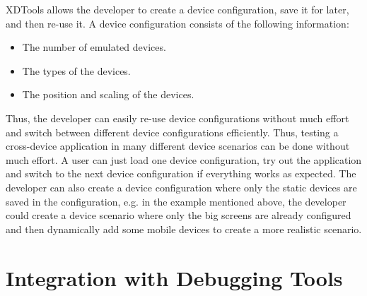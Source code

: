 XDTools allows the developer to create a device configuration, save it for later, and then re-use it. A device configuration consists of the following information:
\begin{itemize}
	\item The number of emulated devices.
	\item The types of the devices.
	\item The position and scaling of the devices.
\end{itemize}
Thus, the developer can easily re-use device configurations without much effort and switch between different device configurations efficiently. Thus, testing a cross-device application in many different device scenarios can be done without much effort. A user can just load one device configuration, try out the application and switch to the next device configuration if everything works as expected. The developer can also create a device configuration where only the static devices are saved in the configuration, e.g. in the example mentioned above, the developer could create a device scenario where only the big screens are already configured and then dynamically add some mobile devices to create a more realistic scenario.

\section{Integration with Debugging Tools}

